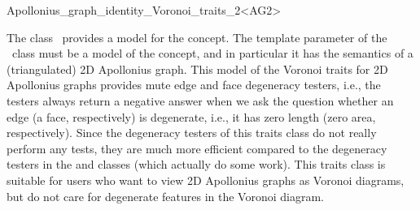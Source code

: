 

\begin{ccRefClass}{Apollonius_graph_identity_Voronoi_traits_2<AG2>}


\ccDefinition

The class \ccRefName\ provides a model for the 
concept. The template parameter of the \ccRefName\ class must be a
model of the  concept, and in particular it has
the semantics of a (triangulated) 2D Apollonius graph.
%
This model of the Voronoi traits for 2D Apollonius graphs provides
mute edge and face degeneracy testers, i.e., the testers always
return a negative answer when we ask the question whether an edge (a
face, respectively) is degenerate, i.e., it has zero length (zero
area, respectively).
Since the degeneracy testers of this traits class do not really
perform any tests, they are much more efficient compared to the
degeneracy testers in the
 and
 classes
(which actually do some work). This traits class is suitable for
users who want to view 2D Apollonius graphs as Voronoi diagrams, but do
not care for degenerate features in the Voronoi diagram.



\ccIsModel
{}

\ccTypes
{}
\ccGlue
{}

\ccSeeAlso
{}\\
\\
\\
\\
\\
\end{ccRefClass}


